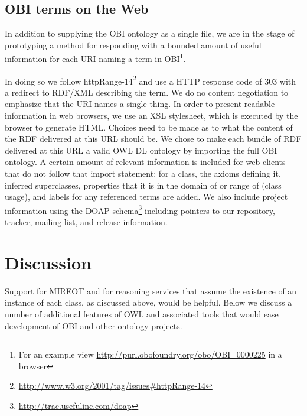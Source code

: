 \documentclass{elsart}       %
\begin{document}
\subsection{OBI terms on the Web}

In addition to supplying the OBI ontology as a single file, we are in the stage of prototyping a method for responding with a bounded amount of useful information for each URI naming a term in OBI\footnote{For an example view \url{http://purl.obofoundry.org/obo/OBI_0000225} in a browser}.

In doing so we follow httpRange-14\footnote{\url{http://www.w3.org/2001/tag/issues#httpRange-14}} and use a HTTP response code of 303 with a redirect to RDF/XML describing the term.
We do no content negotiation to emphasize that the URI names a single thing.
In order to present readable information in web browsers, we use an XSL stylesheet, which is executed by the browser to generate HTML.
Choices need to be made as to what the content of the RDF delivered at this URL should be.
We chose to make each bundle of RDF delivered at this URL a valid OWL DL ontology by importing the full OBI ontology.
A certain amount of relevant information is included for web clients that do not follow that import statement: for a class, the axioms defining it, inferred superclasses, properties that it is in the domain of or range of (class usage), and labels for any referenced terms are added.
We also include project information using the DOAP schema\footnote{\url{http://trac.usefulinc.com/doap}} including pointers to our repository, tracker, mailing list, and release information. 

\section{Discussion}

Support for MIREOT and for reasoning services that assume the existence of an instance of each class, as discussed above, would be helpful.
Below we discuss a number of additional features of OWL and associated tools that would ease development of OBI and other ontology projects.
\end{document}
